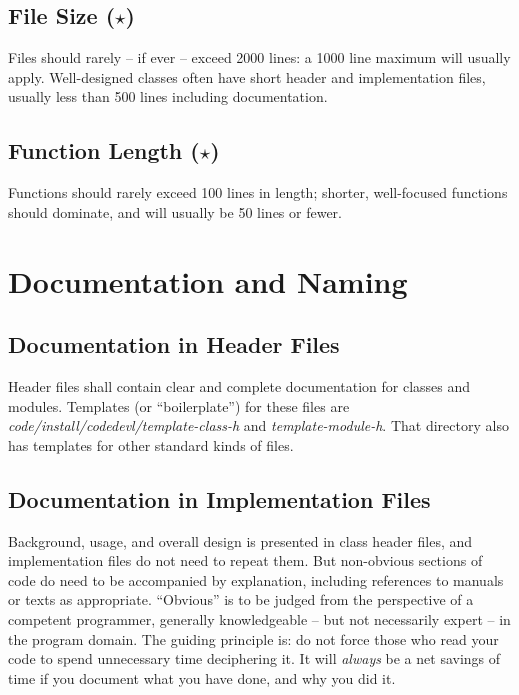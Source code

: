 \subsection {File Size ($\star$)}
Files should rarely -- if ever -- exceed 2000 lines:  a 1000 line
maximum will usually apply.  Well-designed classes often have short header
and implementation files, usually less than 500 lines including documentation.
\subsection {Function Length ($\star$)}
Functions should rarely exceed 100 lines in length; shorter, well-focused
functions should dominate, and will usually be 50 lines or fewer.
\section {Documentation and Naming}
\subsection {Documentation in Header Files}
Header files shall contain clear and complete documentation for classes and
modules.  Templates (or ``boilerplate'') for these files are 
{\em code/install/codedevl/template-class-h} and {\em template-module-h}.
That directory also has templates for other standard kinds of files.
\subsection {Documentation in Implementation Files}
Background, usage, and overall design is presented in class header files,
and implementation files do not need to repeat them.  But non-obvious
sections of code do need to be accompanied by explanation, including 
references to manuals or texts as appropriate. ``Obvious'' is to be
judged from the perspective of a competent programmer, generally 
knowledgeable -- but not necessarily expert -- in the program domain.  The
guiding principle is:  do not force those who read your code to spend 
unnecessary time deciphering it.  It will {\em always} be a net savings
of time if you document what you have done, and why you did it.

